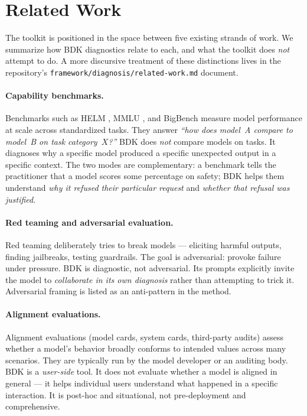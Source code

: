 \section{Related Work}
\label{sec:related}

The toolkit is positioned in the space between five existing strands of
work. We summarize how BDK diagnostics relate to each, and what the toolkit
does \emph{not} attempt to do. A more discursive treatment of these
distinctions lives in the repository's \texttt{framework/diagnosis/related-work.md}
document.

\paragraph{Capability benchmarks.}
Benchmarks such as HELM \citep{liang2022holistic}, MMLU
\citep{hendrycks2020measuring}, and BigBench
\citep{srivastava2022beyond} measure model performance at scale across
standardized tasks. They answer \emph{``how does model~A compare to
model~B on task category~$X$?''} BDK does \emph{not}
compare models on tasks. It diagnoses why a specific model produced a
specific unexpected output in a specific context. The two modes are
complementary: a benchmark tells the practitioner that a model scores
some percentage on safety; BDK helps them understand
\emph{why it refused their particular request} and \emph{whether that
refusal was justified}.

\paragraph{Red teaming and adversarial evaluation.}
Red teaming \citep{perez2022red, ganguli2022red} deliberately tries to
break models --- eliciting harmful outputs, finding jailbreaks, testing
guardrails. The goal is adversarial: provoke failure under pressure.
BDK is diagnostic, not adversarial. Its prompts explicitly
invite the model to \emph{collaborate in its own diagnosis} rather than
attempting to trick it. Adversarial framing is listed as an
anti-pattern in the method.

\paragraph{Alignment evaluations.}
Alignment evaluations (model cards, system cards, third-party audits)
assess whether a model's behavior broadly conforms to intended values
across many scenarios. They are typically run by the model developer
or an auditing body. BDK is a \emph{user-side} tool. It does
not evaluate whether a model is aligned in general --- it helps
individual users understand what happened in a specific interaction.
It is post-hoc and situational, not pre-deployment and comprehensive.

